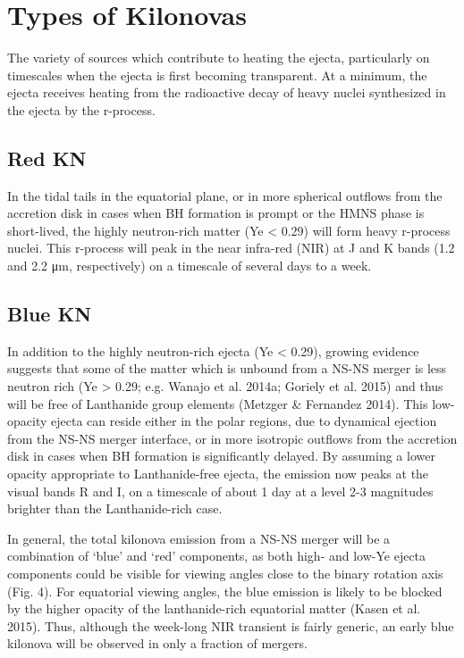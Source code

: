 \section{Types of Kilonovas}

The variety of sources which contribute to heating the ejecta, particularly on timescales when the ejecta is first becoming transparent.
At a minimum, the ejecta receives heating from the radioactive decay of heavy nuclei synthesized in the ejecta by the r-process. 

\subsection{Red KN}

In the tidal tails in the equatorial plane, or in more spherical outflows from the accretion disk in cases when BH formation is prompt or the HMNS phase is short-lived, the highly neutron-rich matter (Ye < 0.29) will form heavy r-process nuclei.
This r-process will peak in the near infra-red (NIR) at J and K bands (1.2 and 2.2 μm, respectively) on a timescale of several days to a week.

\subsection{Blue KN}

In addition to the highly neutron-rich ejecta (Ye < 0.29), growing evidence suggests that some of the matter which is unbound from a NS-NS merger is less neutron rich (Ye > 0.29; e.g. Wanajo et al. 2014a; Goriely et al. 2015) and thus will be free of Lanthanide group elements (Metzger \& Fernandez 2014). This low-opacity ejecta can reside either in the polar regions, due to dynamical ejection from the NS-NS merger interface, or in more isotropic outflows from the accretion disk in cases when BH formation is significantly delayed.
By assuming a lower opacity appropriate to Lanthanide-free ejecta, the emission now peaks at the visual bands R and I, on a timescale of about 1 day at a level 2-3 magnitudes brighter than the Lanthanide-rich case.

In general, the total kilonova emission from a NS-NS merger will be a combination of `blue' and `red' components, as both high- and low-Ye ejecta components could be visible for viewing angles close to the binary rotation axis (Fig. 4). For equatorial viewing angles, the blue emission is likely to be blocked by the higher opacity of the lanthanide-rich equatorial matter (Kasen et al. 2015). Thus, although the week-long NIR transient is fairly generic, an early blue kilonova will be observed in only a fraction of mergers.

